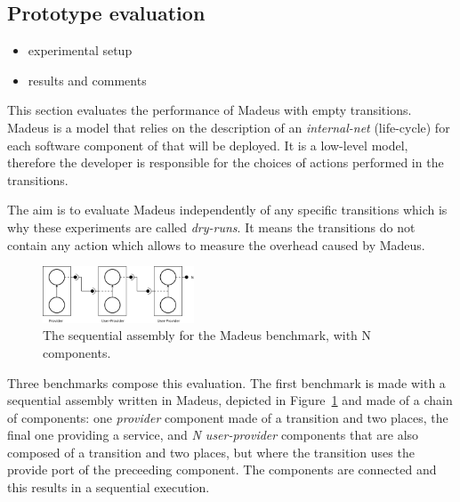 
\subsection{Prototype evaluation}

\begin{itemize}
\item experimental setup
\item results and comments
\end{itemize}
This section evaluates the performance of Madeus with empty transitions.
Madeus is a model that relies on the description of an \emph{internal-net} (life-cycle) for each software component of that will be deployed. It is a low-level model, therefore the developer is responsible for the choices of actions performed in the transitions.

The aim is to evaluate Madeus independently of any specific transitions which is why these experiments are called \emph{dry-runs}. It means the transitions do not contain any action which allows to measure the overhead caused by Madeus.


\begin{figure}[h]
  \begin{center}
    \includegraphics[width=0.4\textwidth]{./images/seq.pdf}
    \caption{The sequential assembly for the Madeus benchmark, with N components.}
    \label{fig:seq}
  \end{center}
\end{figure}

Three benchmarks compose this evaluation. The first benchmark is made with a sequential assembly written in Madeus, depicted in Figure~\ref{fig:seq}
and made of a chain of components: one \emph{provider} component made of a transition and two places, the final one providing a service, and \emph{N user-provider} components that are also composed of a transition and two places, but where the transition uses the provide port of the preceeding component. The components are connected and this results in a sequential execution.

